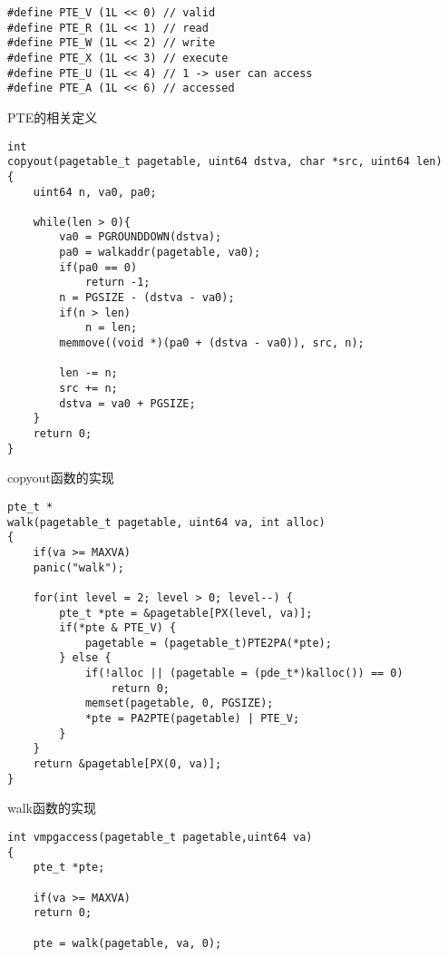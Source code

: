 {\begin{listing}[!htb]
	\begin{verbatim}
#define PTE_V (1L << 0) // valid
#define PTE_R (1L << 1) // read
#define PTE_W (1L << 2) // write
#define PTE_X (1L << 3) // execute
#define PTE_U (1L << 4) // 1 -> user can access
#define PTE_A (1L << 6) // accessed
	\end{verbatim}
	\caption{PTE的相关定义}\label{lst:define_PTE_A}
\end{listing}

\begin{listing}[!htb]
	\begin{verbatim}
int
copyout(pagetable_t pagetable, uint64 dstva, char *src, uint64 len)
{
    uint64 n, va0, pa0;

    while(len > 0){
        va0 = PGROUNDDOWN(dstva);
        pa0 = walkaddr(pagetable, va0);
        if(pa0 == 0)
            return -1;
        n = PGSIZE - (dstva - va0);
        if(n > len)
            n = len;
        memmove((void *)(pa0 + (dstva - va0)), src, n);

        len -= n;
        src += n;
        dstva = va0 + PGSIZE;
    }
    return 0;
}
	\end{verbatim}
	\caption{copyout函数的实现}\label{lst:copyout}
\end{listing}

\begin{listing}[!htb]
	\begin{verbatim}
pte_t *
walk(pagetable_t pagetable, uint64 va, int alloc)
{
    if(va >= MAXVA)
    panic("walk");

    for(int level = 2; level > 0; level--) {
        pte_t *pte = &pagetable[PX(level, va)];
        if(*pte & PTE_V) {
            pagetable = (pagetable_t)PTE2PA(*pte);
        } else {
            if(!alloc || (pagetable = (pde_t*)kalloc()) == 0)
                return 0;
            memset(pagetable, 0, PGSIZE);
            *pte = PA2PTE(pagetable) | PTE_V;
        }
    }
    return &pagetable[PX(0, va)];
}
	\end{verbatim}
	\caption{walk函数的实现}\label{lst:walk}
\end{listing}

\begin{listing}[!htb]
	\begin{verbatim}
int vmpgaccess(pagetable_t pagetable,uint64 va)
{
    pte_t *pte;

    if(va >= MAXVA)
    return 0;

    pte = walk(pagetable, va, 0);


\end{verbatim}
\end{listing}}
